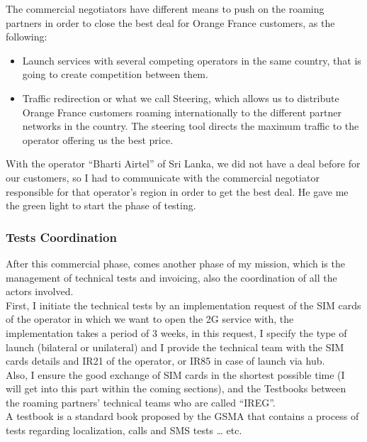 The commercial negotiators have different means to push on the roaming partners in order to close the best deal for Orange France customers, as the following:\par
\begin{itemize}
    \setlength\itemsep{0.2em}
    \item Launch services with several competing operators in the same country, that is going to create competition between them.
    \item Traffic redirection or what we call Steering, which allows us to distribute Orange France customers roaming internationally to the different partner networks in the country. The steering tool directs the maximum traffic to the operator offering us the best price.
\end{itemize}

With the operator “Bharti Airtel” of Sri Lanka, we did not have a deal before for our customers, so I had to communicate with the commercial negotiator responsible for that operator’s region in order to get the best deal. He gave me the green light to start the phase of testing.\\

\subsubsection{Tests Coordination}
\-\hspace{0.5cm} After this commercial phase, comes another phase of my mission, which is the management of technical tests and invoicing, also the coordination of all the actors involved.\\

First, I initiate the technical tests by an implementation request of the \acs{SIM} cards of the operator in which we want to open the \acs{2G} service with, the implementation takes a period of 3 weeks, in this request, I specify the type of launch (bilateral or unilateral) and I provide the technical team with the \acs{SIM} cards details and IR21 of the operator, or IR85 in case of launch via hub. \\

Also, I ensure the good exchange of \acs{SIM} cards in the shortest possible time (I will get into this part within the coming sections), and the Testbooks between the roaming partners’ technical teams who are called “IREG”. \\

A testbook is a standard book proposed by the \acs{GSMA} that contains a process of tests regarding localization, calls and \acs{SMS} tests … etc.\\

